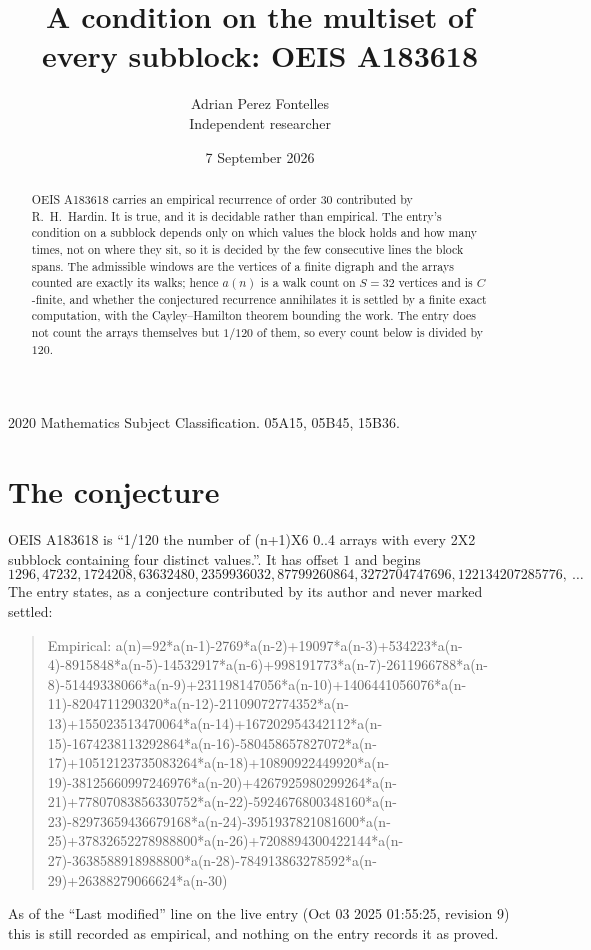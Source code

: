 \documentclass[11pt,a4paper]{article}
\title{A condition on the multiset of every subblock: OEIS A183618}
\author{Adrian Perez Fontelles\\ \small Independent researcher}
\date{7 September 2026}
\theoremstyle{plain}
\theoremstyle{definition}
\begin{document}
\maketitle

\begin{abstract}
OEIS A183618 carries an empirical recurrence of order $30$ contributed by R.~H.~Hardin. It is
true, and it is decidable rather than empirical. The entry's condition on a subblock depends
only on which values the block holds and how many times, not on where they sit, so it is
decided by the few consecutive lines the block spans. The admissible windows are the vertices
of a finite digraph and the arrays counted are exactly its walks; hence $a(n)$ is a walk count
on $S=32$ vertices and is $C$-finite, and whether the conjectured recurrence annihilates it
is settled by a finite exact computation, with the Cayley--Hamilton theorem bounding the
work. The entry does not count the arrays themselves but $1/120$ of them, so every count below is divided by $120$.
\end{abstract}

\noindent\small 2020 Mathematics Subject Classification. 05A15, 05B45, 15B36.\normalsize

\section{The conjecture}

OEIS A183618 is ``1/120 the number of (n+1)X6 0..4 arrays with every 2X2 subblock containing four distinct values.''. It has offset $1$ and begins
\[
1296, 47232, 1724208, 63632480, 2359936032, 87799260864, 3272704747696, 122134207285776,\ \dots
\]
The entry states, as a conjecture contributed by its author and never marked settled:
\begin{quote}
Empirical: a(n)=92*a(n-1)-2769*a(n-2)+19097*a(n-3)+534223*a(n-4)-8915848*a(n-5)-14532917*a(n-6)+998191773*a(n-7)-2611966788*a(n-8)-51449338066*a(n-9)+231198147056*a(n-10)+1406441056076*a(n-11)-8204711290320*a(n-12)-21109072774352*a(n-13)+155023513470064*a(n-14)+167202954342112*a(n-15)-1674238113292864*a(n-16)-580458657827072*a(n-17)+10512123735083264*a(n-18)+10890922449920*a(n-19)-38125660997246976*a(n-20)+4267925980299264*a(n-21)+77807083856330752*a(n-22)-5924676800348160*a(n-23)-82973659436679168*a(n-24)-3951937821081600*a(n-25)+37832652278988800*a(n-26)+7208894300422144*a(n-27)-3638588918988800*a(n-28)-784913863278592*a(n-29)+26388279066624*a(n-30)
\end{quote}
As of the ``Last modified'' line on the live entry (Oct 03 2025 01:55:25, revision 9) this is still
recorded as empirical, and nothing on the entry records it as proved.
\end{document}
